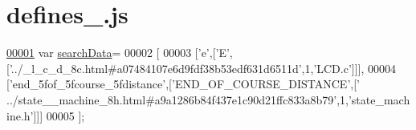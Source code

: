 \hypertarget{defines__4_8js_source}{}\section{defines\+\_.\+js}
\label{defines__4_8js_source}

\begin{DoxyCode}
\hypertarget{defines__4_8js_source.tex_l00001}{}\hyperlink{defines__4_8js_ad01a7523f103d6242ef9b0451861231e}{00001} var \hyperlink{defines__4_8js_ad01a7523f103d6242ef9b0451861231e}{searchData}=
00002 [
00003   [\textcolor{charliteral}{'e'},[\textcolor{charliteral}{'E'},[\textcolor{stringliteral}{'../\_l\_c\_d\_8c.html#a07484107e6d9fdf38b53edf631d6511d'},1,\textcolor{stringliteral}{'LCD.c'}]]],
00004   [\textcolor{stringliteral}{'end\_5fof\_5fcourse\_5fdistance'},[\textcolor{stringliteral}{'END\_OF\_COURSE\_DISTANCE'},[\textcolor{stringliteral}{'
      ../state\_\_machine\_8h.html#a9a1286b84f437e1c90d21ffc833a8b79'},1,\textcolor{stringliteral}{'state\_machine.h'}]]]
00005 ];
\end{DoxyCode}
